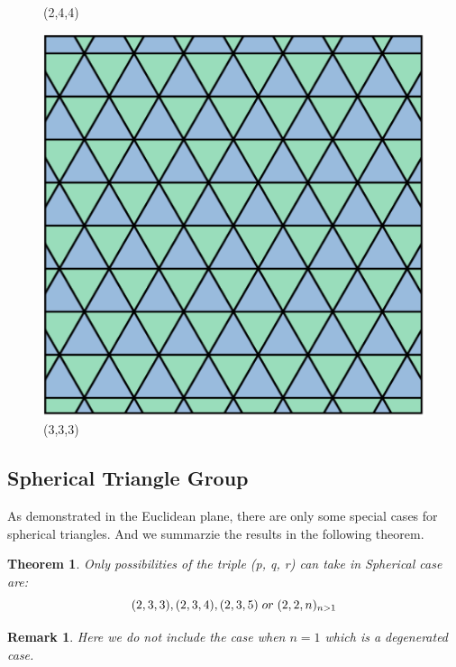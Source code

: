 \documentclass{article}
\newtheorem{Thm}{Theorem}[section]
\newtheorem*{Rk*}{Remark}
\begin{document}
\begin{figure}[h]
\begin{minipage}{0.22\linewidth}
        \caption{(2,4,4)}
    \end{minipage}
    \begin{minipage}{0.22\linewidth}
        \centering
        \includegraphics[width={0.8\linewidth}]{3_3_3.png}
        \caption{(3,3,3)}
    \end{minipage}
\end{figure}
\subsection{Spherical Triangle Group}
As demonstrated in the Euclidean plane, there are only some special cases for spherical triangles. And we summarzie the results in the following theorem.
\begin{Thm}
    Only possibilities of the triple (p, q, r) can take in Spherical case are:
    $$(2,3,3), (2,3,4), (2,3,5)\hspace{1mm} or \hspace{1mm}(2,2,n)_{n>1}$$
\end{Thm}

\begin{Rk*}
    Here we do not include the case when $n=1$ which is a degenerated case.
\end{Rk*}
\end{document}
